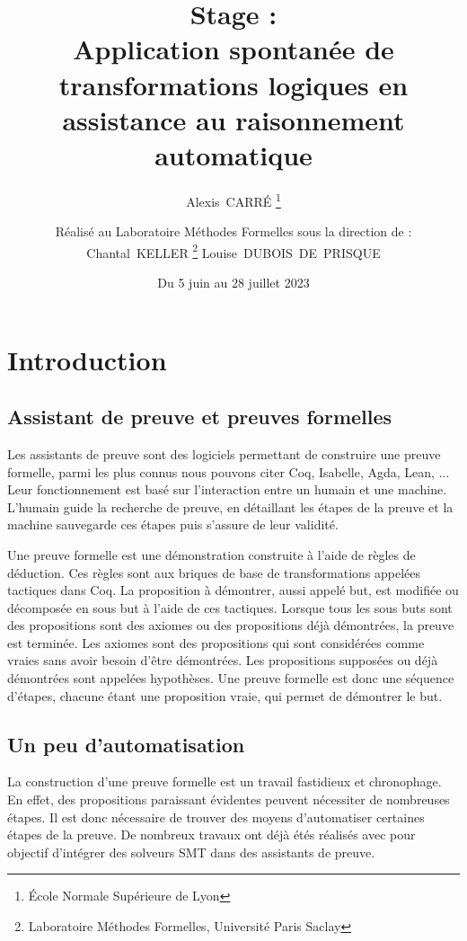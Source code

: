 \documentclass[titlepage,draft]{article}
\title{
    Stage :\\[1em]
    Application spontanée de transformations logiques en assistance au raisonnement automatique
}
\date{Du 5 juin au 28 juillet 2023}
\author{
    Alexis~CARRÉ \thanks{École Normale Supérieure de Lyon}
    \vspace{1em}
    \and
    Réalisé au Laboratoire Méthodes Formelles sous la direction de :\\[1em]
    Chantal~KELLER \thanks{Laboratoire Méthodes Formelles, Université Paris Saclay}
    \hspace{1em}
    Louise~DUBOIS~DE~PRISQUE\footnotemark[2]
    \vspace{2em}
}
\begin{document}
\maketitle

\tableofcontents
\newpage

\section{Introduction}
\subsection{Assistant de preuve et preuves formelles}
Les assistants de preuve sont des logiciels permettant de construire une preuve formelle, parmi les plus connus nous pouvons citer Coq, Isabelle, Agda, Lean, ... Leur fonctionnement est basé sur l'interaction entre un humain et une machine. L'humain guide la recherche de preuve, en détaillant les étapes de la preuve et la machine sauvegarde ces étapes puis s'assure de leur validité.

Une preuve formelle est une démonstration construite à l'aide de règles de déduction. Ces règles sont aux briques de base de transformations appelées tactiques dans Coq. La proposition à démontrer, aussi appelé but, est modifiée ou décomposée en sous but à l'aide de ces tactiques. Lorsque tous les sous buts sont des propositions sont des axiomes ou des propositions déjà démontrées, la preuve est terminée. Les axiomes sont des propositions qui sont considérées comme vraies sans avoir besoin d'être démontrées. Les propositions supposées ou déjà démontrées sont appelées hypothèses. Une preuve formelle est donc une séquence d'étapes, chacune étant une proposition vraie, qui permet de démontrer le but.

\subsection{Un peu d'automatisation}
La construction d'une preuve formelle est un travail fastidieux et chronophage. En effet, des propositions paraissant évidentes peuvent nécessiter de nombreuses étapes. Il est donc nécessaire de trouver des moyens d'automatiser certaines étapes de la preuve. De nombreux travaux ont déjà étés réalisés avec pour objectif d'intégrer des solveurs SMT dans des assistants de preuve.
\end{document}

